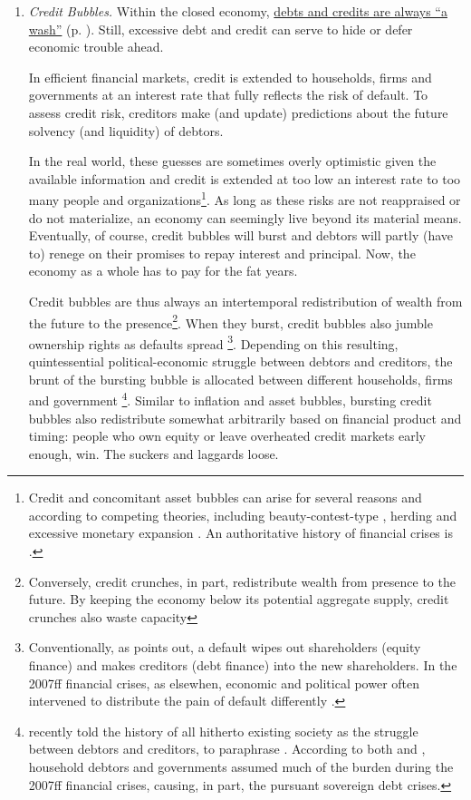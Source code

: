 \begin{enumerate}
	\item {} \label{it:credit_bubbles} \emph{Credit Bubbles.} Within the closed economy, \hyperref[it:credits_debits_wash]{debts and credits are always ``a wash''} (p. \pageref{it:credits_debits_wash}). Still, excessive debt and credit can serve to hide or defer economic trouble ahead. 

	In efficient financial markets, credit is extended to households, firms and governments at an interest rate that fully reflects the risk of default. To assess credit risk, creditors make (and update) predictions about the future solvency (and liquidity) of debtors. 

	In the real world, these guesses are sometimes overly optimistic given the available information and credit is extended at too low an interest rate to too many people and organizations\footnote{
		Credit and concomitant asset bubbles can arise for several reasons and according to competing theories, including beauty-contest-type \citep{Keynes1936}, herding \citep{Banerjee-1992-aa} and excessive monetary expansion \citep{Stiglitz2010}. An authoritative history of financial crises is \cite{KindlebergerAliber-2005-aa}.}. 
	As long as these risks are not reappraised or do not materialize, an economy can seemingly live beyond its material means. Eventually, of course, credit bubbles will burst and debtors will partly (have to) renege on their promises to repay interest and principal. Now, the economy as a whole has to pay for the fat years.

	Credit bubbles are thus always an intertemporal redistribution of wealth from the future to the presence\footnote{
		Conversely, credit crunches, in part, redistribute wealth from presence to the future. By keeping the economy below its potential aggregate supply, credit crunches also waste capacity}. 
	When they burst, credit bubbles also jumble ownership rights as defaults spread \citep{Stiglitz2010}\footnote{
		Conventionally, as \citeauthor{Stiglitz2010} points out, a default wipes out shareholders (equity finance) and makes creditors (debt finance) into the new shareholders. In the 2007ff financial crises, as elsewhen, economic and political power often intervened to distribute the pain of default differently \citep{Stiglitz2010}.}. 
	Depending on this resulting, quintessential political-economic struggle between debtors and creditors, the brunt of the bursting bubble is allocated between different households, firms and government \citep{Coggan2011}\footnote{
		\citealt{Coggan2011} recently told the history of all hitherto existing society as the struggle between debtors and creditors, to paraphrase \cite{MarxEngels-1848-aa}. According to both \citeauthor{Coggan2011} and \cite{Stiglitz2010}, household debtors and governments assumed much of the burden during the 2007ff financial crises, causing, in part, the pursuant sovereign debt crises.}. 
	Similar to inflation and asset bubbles, bursting credit bubbles also redistribute somewhat arbitrarily based on financial product and timing: people who own equity or leave overheated credit markets early enough, win. The suckers and laggards loose.


\end{enumerate}
